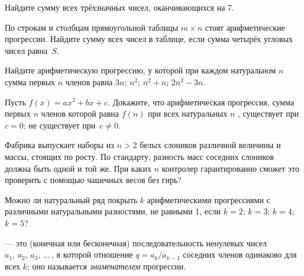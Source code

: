 \documentclass[a4paper,11pt]{article}
\begin{document}
Найдите сумму всех трёхзначных чисел, оканчивающихся на 7.


По строкам и столбцам прямоугольной таблицы %
$m\times n$ стоят
арифметические прогрессии. Найдите сумму всех чисел в таблице,
если сумма четырёх угловых чисел равна~$S$.


 Найдите арифметическую прогрессию, у которой при каждом натуральном $n$
сумма первых $n$ членов равна
 $3n$;  $n^2$;  $n^2+n$;  $2n^2-3n$.

Пусть $f(x)=ax^2+bx+c$. Докажите, что арифметическая прогрессия, сумма первых $n$ членов которой равна $f(n)$ при всех натуральных $n$ ,
 существует при $c=0$;
 не существует при~$c\ne0$.

Фабрика выпускает наборы из $n>2$ белых слоников различной
величины и массы, стоящих по росту. По стандарту, разность масс
соседних слоников должна быть одной и той же. При каких $n$ контролер
гарантированно сможет это проверить с помощью чашечных весов без гирь?


Можно ли натуральный ряд покрыть $k$ арифметическими
прогрессиями с различными натуральными разностями, не равными 1,
если
 $k=2$;
 $k=3$;
 $k=4$;
 $k=5$?





\vspace*{-5pt}

  --- это (конечная или бесконечная)
последовательность ненулевых чисел $a_1,\,a_2,\,a_3,\,\ldots\,$,
в которой отношение $q=a_k/a_{k-1}$ соседних членов
одинаково для всех $k$; оно называется {\it знаменателем\/} прогрессии.
\end{document}
